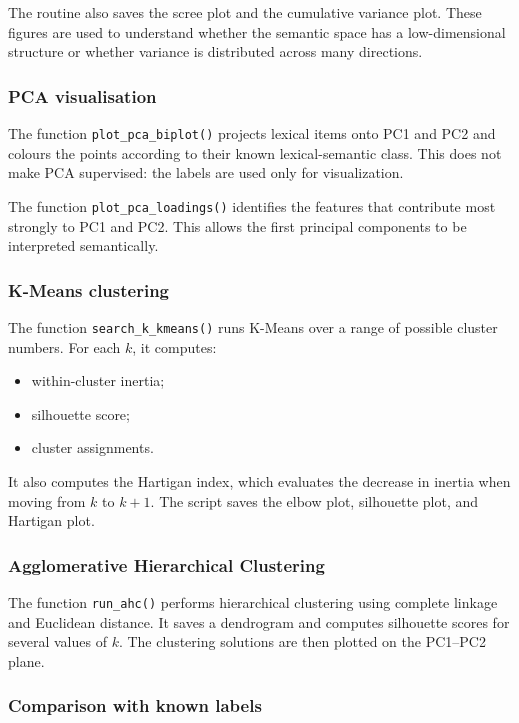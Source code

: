 \documentclass{ipgpmaster}
\begin{document}
The routine also saves the scree plot and the cumulative variance plot. These figures are used to understand whether the semantic space has a low-dimensional structure or whether variance is distributed across many directions.

\subsubsection{PCA visualisation}

The function \texttt{plot\_pca\_biplot()} projects lexical items onto PC1 and PC2 and colours the points according to their known lexical-semantic class. This does not make PCA supervised: the labels are used only for visualization.

The function \texttt{plot\_pca\_loadings()} identifies the features that contribute most strongly to PC1 and PC2. This allows the first principal components to be interpreted semantically.

\subsubsection{K-Means clustering}

The function \texttt{search\_k\_kmeans()} runs K-Means over a range of possible cluster numbers. For each \(k\), it computes:

\begin{itemize}
    \item within-cluster inertia;
    \item silhouette score;
    \item cluster assignments.
\end{itemize}

It also computes the Hartigan index, which evaluates the decrease in inertia when moving from \(k\) to \(k+1\). The script saves the elbow plot, silhouette plot, and Hartigan plot.

\subsubsection{Agglomerative Hierarchical Clustering}

The function \texttt{run\_ahc()} performs hierarchical clustering using complete linkage and Euclidean distance. It saves a dendrogram and computes silhouette scores for several values of \(k\). The clustering solutions are then plotted on the PC1--PC2 plane.

\subsubsection{Comparison with known labels}
\end{document}
